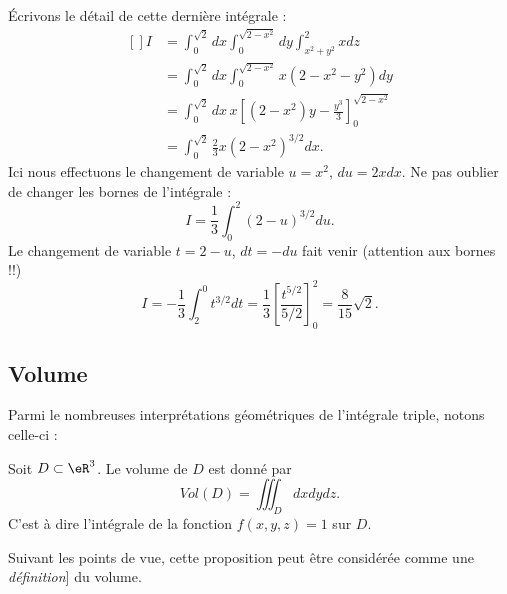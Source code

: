 \begin{example}
    Écrivons le détail de cette dernière intégrale :
    \begin{equation}
        \begin{aligned}[]
            I&=\int_0^{\sqrt{2}}dx\int_0^{\sqrt{2-x^2}}dy\int_{x^2+y^2}^2xdz\\
            &=\int_0^{\sqrt{2}}dx\int_0^{\sqrt{2-x^2}}x(2-x^2-y^2)dy\\
            &=\int_0^{\sqrt{2}}dx\,x\left[ (2-x^2)y-\frac{ y^3 }{ 3 } \right]_0^{\sqrt{2-x^2}}\\
            &=\int_0^{\sqrt{2}}\frac{ 2 }{ 3 }x(2-x^2)^{3/2}dx.
        \end{aligned}
    \end{equation}
    Ici nous effectuons le changement de variable $u=x^2$, $du=2xdx$. Ne pas oublier de changer les bornes de l'intégrale :
    \begin{equation}
        I=\frac{1}{ 3 }\int_0^2(2-u)^{3/2}du.
    \end{equation}
    Le changement de variable $t=2-u$, $dt=-du$ fait venir (attention aux bornes !!)
    \begin{equation}
        I=-\frac{1}{ 3 }\int_2^0t^{3/2}dt=\frac{1}{ 3 }\left[ \frac{ t^{5/2} }{ 5/2 } \right]_0^2=\frac{ 8 }{ 15 }\sqrt{2}.
    \end{equation}
       
\end{example}

\subsection{Volume}

Parmi le nombreuses interprétations géométriques de l'intégrale triple, notons celle-ci :
\begin{proposition}
    Soit $D\subset \eR^3$. Le volume de $D$ est donné par 
    \begin{equation}
        Vol(D)=\iiint_D dxdydz.
    \end{equation}
    C'est à dire l'intégrale de la fonction $f(x,y,z)=1$ sur $D$.
\end{proposition}
Suivant les points de vue, cette proposition peut être considérée comme une \emph{définition}] du volume.

